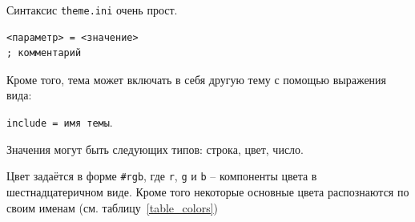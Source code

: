 \documentclass[a4paper,12pt]{article}
\begin{document}
Синтаксис \verb/theme.ini/ очень прост.

\begin{verbatim}
<параметр> = <значение>
; комментарий
\end{verbatim}

Кроме того, тема может включать в себя другую тему с помощью выражения вида:

\verb/include = имя темы/.

Значения могут быть следующих типов: строка, цвет, число.

Цвет задаётся в форме \verb/#rgb/, где \verb/r/, \verb/g/ и \verb/b/ -- компоненты цвета в шестнадцатеричном виде. Кроме того некоторые основные цвета распознаются по своим именам (см. таблицу~\ref{table_colors})

\newcommand{\tabColor}[2]{
\textrm{#1} & \colorbox[HTML]{#2}{T.}
}

\newcommand{\tabColorq}[8]{
\tabColor{#1}{#2} & \tabColor{#3}{#4} & \tabColor{#5}{#6} & \tabColor{#7}{#8} \\
}

\newcommand{\tabColort}[6]{
\tabColor{#1}{#2} & \tabColor{#3}{#4} & \tabColor{#5}{#6} & & \\
}
\end{document}
